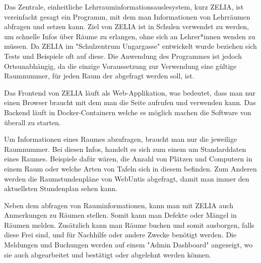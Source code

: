 

Das Zentrale, einheitliche Lehrrauminformationsauslesystem, kurz ZELIA, ist vereinfacht gesagt ein Programm, mit dem man Informationen von Lehrräumen abfragen und setzen kann. Ziel von ZELIA ist in Schulen verwendet zu werden, um schnelle Infos über Räume zu erlangen, ohne sich an Lehrer*innen wenden zu müssen. Da ZELIA im "Schulzentrum Ungargasse" entwickelt wurde beziehen sich Tests und Beispiele oft auf diese. Die Anwendung des Programmes ist jedoch Ortsunabhängig, da die einzige Voraussetzung zur Verwendung eine gültige Raumnummer, für jeden Raum der abgefragt werden soll, ist. 

Das Frontend von ZELIA läuft als Web-Applikation, was bedeutet, dass man nur einen Browser braucht mit dem man die Seite aufrufen und verwenden kann. Das Backend läuft in Docker-Containern welche es möglich machen die Software von überall zu starten.

Um Informationen eines Raumes abzufragen, braucht man nur die jeweilige Raumnummer. Bei diesen Infos, handelt es sich zum einem um Standarddaten eines Raumes. Beispiele dafür wären, die Anzahl von Plätzen und Computern in einem Raum oder welche Arten von Tafeln sich in diesem befinden. Zum Anderen werden die Raumstundenpläne von WebUntis abgefragt, damit man immer den aktuellsten Stundenplan sehen kann.

Neben dem abfragen von Rauminformationen, kann man mit ZELIA auch Anmerkungen zu Räumen stellen. Somit kann man Defekte oder Mängel in Räumen melden. Zusätzlich kann man Räume buchen und somit ausborgen, falls diese Frei sind, und für Nachhilfe oder andere Zwecke benötigt werden. Die Meldungen und Buchungen werden auf einem "Admin Dashboard" angezeigt, wo sie auch abgearbeitet und bestätigt oder abgelehnt werden können. 


